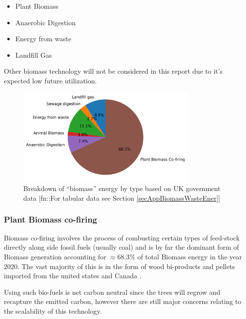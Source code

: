 \documentclass[11pt]{article}
\numberwithin{equation}{section}
\begin{document}
\begin{itemize}
\item Plant Biomass
\item Anaerobic Digestion
\item Energy from waste
\item Landfill Gas
\end{itemize}

Other biomass technology will not be considered in this report due to it's expected low future utilization.

\begin{figure}[H]
\centering
\includegraphics[width=0.8\textwidth]{./.ob-jupyter/603c0a61cc39a759145c8c2636878e943182f773.png}
\caption{\label{figPie2020BiomassBreakdown}Breakdown of ``biomass'' energy by type based on UK government data \cite{RenewableElecricityCap}[fn::For tabular data see Section \ref{secAppBiomassWasteEner}]}
\end{figure}

\subsubsection{Plant Biomass co-firing}
\label{sec:org03189aa}
Biomass co-firing involves the process of combusting certain types of feed-stock directly along side fossil fuels (usually coal) and is by far the dominant form of Biomass generation accounting for \(\approx\)68.3\% of total Biomass energy in the year 2020. The vast majority of this is in the form of wood bi-products and pellets imported from the united states and Canada \cite{BiomassPolicyStatement}.

Using such bio-fuels is net carbon neutral since the trees will regrow and recapture the emitted carbon, however there are still major concerns relating to the scalability of this technology.
\end{document}

